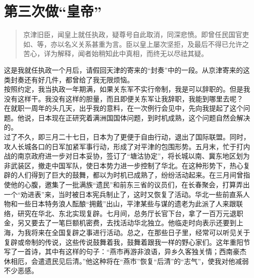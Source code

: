 \fancyhead[RO]{} %
\fancyhead[LE]{} %
\chapter*{第三次做“皇帝”}
\thispagestyle{empty}
\begin{quote}
	京津旧臣，闻皇上就任执政，疑尊号自此取消，同深悲愤。即曾任民国官吏如、等，亦以名义关系甚重为言。臣以皇上屡次坚拒，及最后不得已允许之苦心，详为解释，闻者始稍知此中真相，而终无以尽祛其疑。\\
\end{quote}

这是我就任执政一个月后，请假回天津的寄来的“封奏”中的一段。从京津寄来的这类封奏还有好几件，都曾给了我无限烦恼。\\

按照约定，我当执政一年期满，如果关东军不实行帝制，我是可以辞职的。但是我没有这样干。我没有这样的胆量，而且即便关东军让我辞职，我能到哪里去呢？\\

在就职一周年的头几天，出乎我的意料，在一次例行会见中，先向我提起了这个问题。他说，日本现在正研究着满洲国国体问题，到时机成熟，这个问题自然会解决的。\\

过了不久，即三月二十七日，日本为了更便于自由行动，退出了国际联盟。同时，攻人长城各口的日军加紧军事行动，形成了对平津的包围形势。五月末，忙于打内战的南京政府进一步对日本妥协，签订了“塘沽协定”，将长城以南、冀东地区划为非武装区，撤走中国军队，使日本势力进一步控制了华北。在这种形势下，热心复辟的人们得到了巨大的鼓舞，都以为时机已成熟了，纷纷活动起来。在三月间曾指使他的心腹，邀集了一批满族“遗民”和前东三省的议员们，在长春聚会，打算弄出一个“劝进表”来，当时被日本宪兵制止了，这时又恢复了活动。华北一些前直系人物和一些日本特务浪人酝酿“拥戴”出山，平津某些与谋的遗老为此派了人来跟联络，研究在华北、东北实现复辟。七月间，总务厅长官下台，拿了一百万元退职金，另又要去了一笔巨额机密费，去找活动华北独立。他临走时向表示还要到上海，为我将来在全国复辟之事进行活动。总之，在那些日子里，经常可以听见关于复辟或帝制的传说，这些传说鼓舞着我，鼓舞着跟我一样的野心家们。这年重阳节写了一首诗，其中有这样的句子：“燕市再游非浪语，异乡久客独关情；西南豪杰休相厄，会遣遗民见后清。”他这种将在“燕市”恢复“后清”的“志气”，使我对他减弱不少恶感。\\

